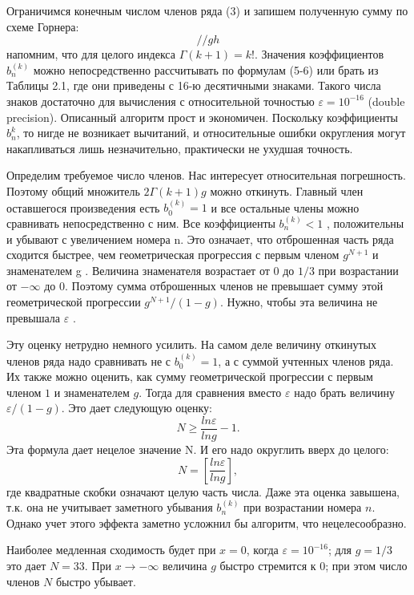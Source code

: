 Ограничимся конечным числом членов ряда (3) и запишем
полученную сумму по схеме Горнера:
\begin{equation}
// gh
\end{equation}
напомним, что для целого индекса $\Gamma(k+1) = k!$. Значения коэффициентов $b_n^{(k)}$
можно непосредственно рассчитывать по формулам (5-6) или брать из Таблицы 2.1, где
они приведены с 16-ю десятичными знаками. Такого числа знаков достаточно
для вычисления с относительной точностью $\varepsilon = 10^{-16}$ (double precision).
Описанный алгоритм прост и экономичен. Поскольку коэффициенты $b_n^{k}$, то нигде не возникает вычитаний, и относительные ошибки округления могут накапливаться лишь незначительно, практически не ухудшая точность.

Определим требуемое число членов. Нас интересует относительная погрешность. Поэтому
общий множитель $2\Gamma(k + 1)g$ можно откинуть. Главный член оставшегося
произведения есть $b_0^{(k)}=1$ и все остальные члены можно сравнивать
непосредственно с ним. Все коэффициенты $b_n^{(k)}<1$ , положительны и убывают с
увеличением номера n. Это означает, что отброшенная часть ряда сходится
быстрее, чем геометрическая прогрессия с первым членом $g^{N+1}$ и знаменателем
g . Величина знаменателя возрастает от $0$ до $1/3$ при возрастании от $-\infty$ до 0.
Поэтому сумма отброшенных членов не превышает сумму этой геометрической
прогрессии $g^{N+1}/(1-g)$. Нужно, чтобы эта величина не превышала $\varepsilon$ .

Эту оценку нетрудно немного усилить. На самом деле величину откинутых
членов ряда надо сравнивать не с $b_0^{(k)}=1$, а с суммой учтенных членов ряда. Их
также можно оценить, как сумму геометрической прогрессии с первым членом
$1$ и знаменателем $g$. Тогда для сравнения вместо $\varepsilon$ надо брать величину
$\varepsilon/(1-g)$. Это дает следующую оценку:
\begin{equation}
N \geqslant \frac{ln \varepsilon}{ln g} - 1.
\end{equation}
Эта формула дает нецелое значение N. И его надо округлить вверх до целого:
\begin{equation}
N = [\frac{ln \varepsilon}{ln g}],
\end{equation}
где квадратные скобки означают целую часть числа. Даже эта оценка завышена,
т.к. она не учитывает заметного убывания $b_n^{(k)}$ при возрастании номера $n$.
Однако учет этого эффекта заметно усложнил бы алгоритм, что
нецелесообразно.

Наиболее медленная сходимость будет при $x = 0$, когда $\varepsilon = 10^{-16}$; для
$g = 1/3$ это дает $N = 33$. При $x \to -\infty$ величина $g$ быстро стремится к $0$; при
этом число членов $N$ быстро убывает.


